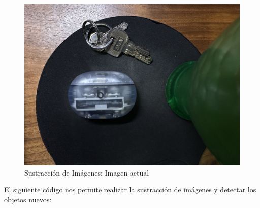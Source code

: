\documentclass[12pt,letterpaper]{article}
\begin{document}
\begin{figure}[H]
  \centering
  \includegraphics[width=0.5\linewidth]{../data/data-substraction-sample/img-2.jpg}
  \caption{Sustracción de Imágenes: Imagen actual}
  \label{fig:sustraccion_actual}
\end{figure}

El siguiente código nos permite realizar la sustracción de imágenes y detectar los objetos nuevos:
\end{document}
